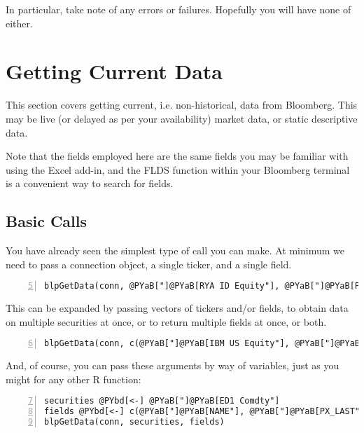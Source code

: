 \documentclass[a4paper]{article}
\begin{document}
    

In particular, take note of any errors or failures. Hopefully you will have none of either.



\section{Getting Current Data} %
\label{sec:getting_current_data}

This section covers getting current, i.e. non-historical, data from Bloomberg. This may be live (or delayed as per your availability) market data, or static descriptive data.

Note that the fields employed here are the same fields you may be familiar with using the Excel add-in, and the FLDS function within your Bloomberg terminal is a convenient way to search for fields.

\subsection{Basic Calls} %
\label{sub:basic_calls}

You have already seen the simplest type of call you can make. At minimum we need to pass a connection object, a single ticker, and a single field.

\begin{Verbatim}[commandchars=@\[\],numbers=left,firstnumber=5,stepnumber=1]
blpGetData(conn, @PYaB["]@PYaB[RYA ID Equity"], @PYaB["]@PYaB[PX_LAST"])
\end{Verbatim}

    

This can be expanded by passing vectors of tickers and/or fields, to obtain data on multiple securities at once, or to return multiple fields at once, or both.

\begin{Verbatim}[commandchars=@\[\],numbers=left,firstnumber=6,stepnumber=1]
blpGetData(conn, c(@PYaB["]@PYaB[IBM US Equity"], @PYaB["]@PYaB[MSFT US Equity"]), c(@PYaB["]@PYaB[NAME"], @PYaB["]@PYaB[PX_LAST"]))
\end{Verbatim}

    

And, of course, you can pass these arguments by way of variables, just as you might for any other R function:

\begin{Verbatim}[commandchars=@\[\],numbers=left,firstnumber=7,stepnumber=1]
securities @PYbd[<-] @PYaB["]@PYaB[ED1 Comdty"]
fields @PYbd[<-] c(@PYaB["]@PYaB[NAME"], @PYaB["]@PYaB[PX_LAST"], @PYaB["]@PYaB[OPEN"])
blpGetData(conn, securities, fields)
\end{Verbatim}
\end{document}
